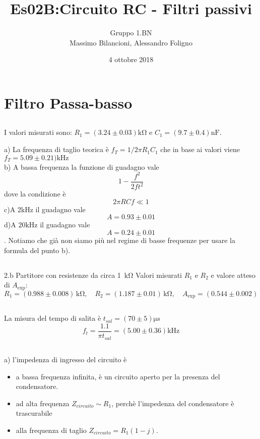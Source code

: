 \documentclass[10pt,a4paper]{article}
\author{Gruppo 1.BN \\ Massimo Bilancioni, Alessandro Foligno }
\title{Es02B:Circuito RC - Filtri passivi}
\begin{document}
\date{4 ottobre 2018}
\maketitle


\section{Filtro Passa-basso}
\subsection{}
\label{passa-basso}

I valori misurati sono: $R_1  = (3.24\pm 0.03 )\si{\kilo\ohm}$ e  $C_1  = (9.7\pm 0.4 )\si{\nano\farad}$.

a) La frequenza di taglio teorica è  $f_T = 1/2\pi R_1 C_1$ che in base ai valori viene $f_T = 5.09\pm 0.21)\si{\kilo\hertz}$\\
b) A bassa frequenza la funzione di guadagno vale \[1-\frac{f^2}{2ft^2}\] dove la condizione è \[2\pi RCf\ll1\]
c)A $2\si{\kilo\hertz}$ il guadagno vale \[A=0.93\pm0.01\]
d)A $20\si{\kilo\hertz}$ il guadagno vale \[A=0.24\pm0.01\]. Notiamo che già non siamo più nel regime di basse frequenze per usare la formula del punto b).
\subsection{}{2.b Partitore con resistenze da circa 1~\si{\kilo\ohm}}
Valori misurati $R_1$ e $R_2$ e valore atteso di $A_\mathrm{exp}$:
\[
R_1 = (0.988  \pm0.008  ) \,\si{\kilo\ohm}, \quad
R_2 = (1.187 \pm 0.01 ) \,\si{\kilo\ohm}, \quad
A_\mathrm{exp} = ( 0.544 \pm 0.002 ) 
\]




\subsection{}

La misura del tempo di salita è $ t_{sal} = (70\pm 5)\si{\micro\second}$
\[ f_t = \frac{1.1}{\pi t_{sal}} = (5.00 \pm 0.36) \si{\kilo\hertz} \]

\subsection{}
a) l'impedenza di ingresso del circuito è
\begin{itemize}

\item a bassa frequenza  infinita, è un circuito aperto per la presenza del condensatore.
\item ad alta frequenza $Z_{circuito}\sim R_1$, perchè l'impedenza del condensatore è trascurabile
\item alla frequenza di taglio  $Z_{circuito} = R_1(1-j)$.

\end{itemize}
\end{document}
